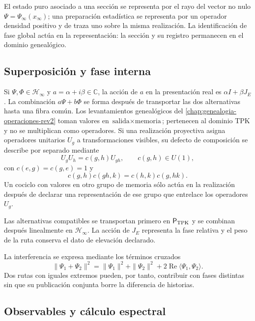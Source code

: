 \begin{principle}
El estado puro asociado a una sección se representa por el rayo del vector
no nulo \(\Psi=\Psi_\infty(x_\infty)\); una preparación estadística se
representa por un operador densidad positivo y de traza uno sobre la misma
realización. La identificación de fase global actúa en la representación:
la sección y su registro permanecen en el dominio genealógico.
\end{principle}

\subsection{Superposición y fase interna}

Si \(\Psi,\Phi\in\mathcal H_\infty\) y
\(a=\alpha+i\beta\in\mathbb C\), la acción de \(a\) en la presentación real
es \(\alpha I+\beta J_E\). La combinación \(a\Psi+b\Phi\) se forma después
de transportar las dos alternativas hasta una fibra común. Los levantamientos
genealógicos del \cref{chap:genealogia-operaciones-rev2} toman valores en
\(\text{salida}\times\text{memoria}\); pertenecen al dominio TPK y no se
multiplican como operadores. Si una realización proyectiva asigna operadores
unitarios \(U_g\) a transformaciones visibles, su defecto de composición se
describe por separado mediante
\[
 U_gU_h=c(g,h)U_{gh},
 \qquad c(g,h)\in U(1),
\]
con \(c(e,g)=c(g,e)=1\) y
\[
 c(g,h)c(gh,k)=c(h,k)c(g,hk).
\]
Un cociclo con valores en otro grupo de memoria sólo actúa en la realización
después de declarar una representación de ese grupo que entrelace los
operadores \(U_g\).

\begin{principle}
Las alternativas compatibles se transportan primero en
\(\mathsf P_{\rm TPK}\) y se combinan después linealmente en
\(\mathcal H_\infty\). La acción de \(J_E\) representa la fase relativa y
el peso de la ruta conserva el dato de elevación declarado.
\end{principle}

La interferencia se expresa mediante los términos cruzados
\[
 \|\Psi_1+\Psi_2\|^2
 =\|\Psi_1\|^2+\|\Psi_2\|^2
  +2\operatorname{Re}\langle\Psi_1,\Psi_2\rangle.
\]
Dos rutas con iguales extremos pueden, por tanto, contribuir con fases
distintas sin que su publicación conjunta borre la diferencia de historias.

\subsection{Observables y cálculo espectral}

